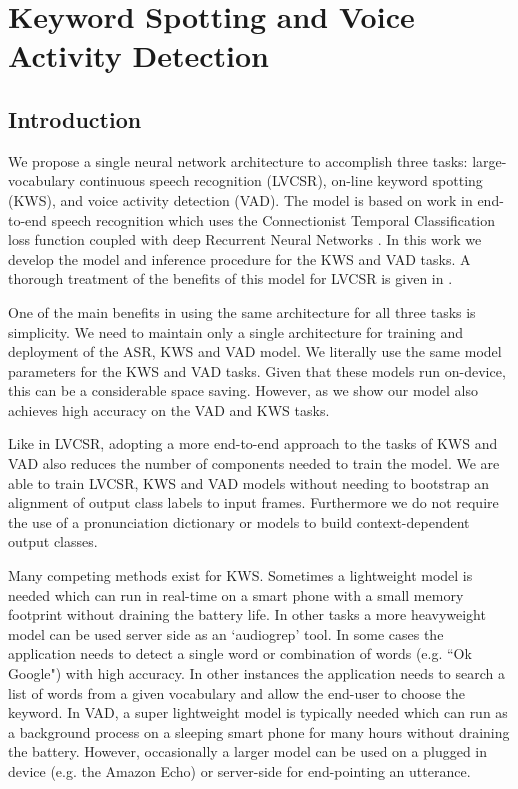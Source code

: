 \chapter[Keyword Spotting]{Keyword Spotting and Voice Activity Detection}

\section{Introduction}

We propose a single neural network architecture to accomplish three tasks:
large-vocabulary continuous speech recognition (LVCSR), on-line keyword
spotting (KWS), and voice activity detection (VAD). The model is based on work
in end-to-end speech recognition which uses the Connectionist Temporal
Classification loss function coupled with deep Recurrent Neural Networks
\cite{graves2014, hannun2014deepspeech}. In this work we develop the model and
inference procedure for the KWS and VAD tasks. A thorough treatment of the
benefits of this model for LVCSR is given in \cite{amodei2016deep}.

One of the main benefits in using the same architecture for all three tasks is
simplicity. We need to maintain only a single architecture for training and
deployment of the ASR, KWS and VAD model. We literally use the same model
parameters for the KWS and VAD tasks. Given that these models run on-device,
this can be a considerable space saving. However, as we show our model also
achieves high accuracy on the VAD and KWS tasks. 

Like in LVCSR, adopting a more end-to-end approach to the tasks of KWS and VAD
also reduces the number of components needed to train the model. We are able to
train LVCSR, KWS and VAD models without needing to bootstrap an alignment of
output class labels to input frames. Furthermore we do not require the use of a
pronunciation dictionary or models to build context-dependent output classes.

Many competing methods exist for KWS. Sometimes a lightweight model is needed
which can run in real-time on a smart phone with a small memory footprint
without draining the battery life. In other tasks a more heavyweight model can
be used server side as an `audiogrep' tool. In some cases the application needs
to detect a single word or combination of words (e.g. ``Ok Google") with high
accuracy. In other instances the application needs to search a list of words
from a given vocabulary and allow the end-user to choose the keyword. In VAD, a
super lightweight model is typically needed which can run as a background
process on a sleeping smart phone for many hours without draining the battery.
However, occasionally a larger model can be used on a plugged in device (e.g.
the Amazon Echo) or server-side for end-pointing an utterance.


